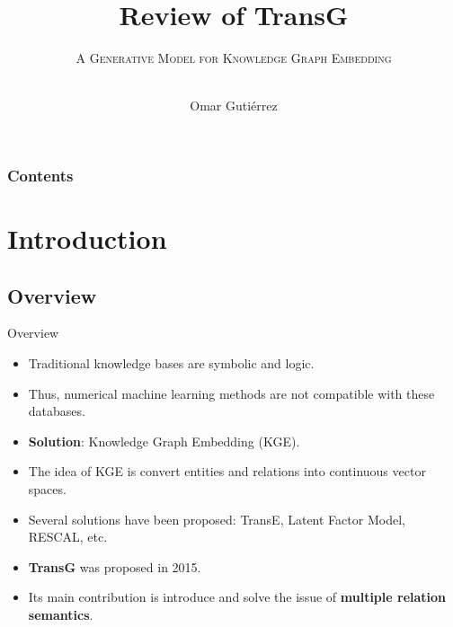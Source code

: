 \documentclass[xcolor={x11names,svgnames,dvipsnames},trans]{beamer}
\author[Omar Gutiérrez]{\texorpdfstring{Omar Gutiérrez}{Omar Gutiérrez}}
\title{Review of TransG}
\subtitle{\texorpdfstring{\textsc{A Generative Model for Knowledge Graph Embedding}\\%
\hrulefill\ \adforn{57}\thickspace\thickspace\adforn{29}\ \hrulefill}{}}
\date[\ccbyncsa]{\ccbyncsa}
\begin{document}
\begin{frame}[plain]
\maketitle
\end{frame}

\begin{frame} \frametitle{Contents}
    \tableofcontents
\end{frame}


\section{Introduction}


\subsection{Overview}
\begin{frame}{Overview}
    \begin{itemize}
        \item Traditional knowledge bases are symbolic and logic.
        \item Thus, numerical machine learning methods are not compatible with these databases.
        \item \textbf{Solution}: Knowledge Graph Embedding (KGE).
        \item The idea of KGE is convert entities and relations into continuous vector spaces.
        \item Several solutions have been proposed: TransE, Latent Factor Model, RESCAL, etc.
        \item \textbf{TransG} was proposed in 2015.
        \item Its main contribution is introduce and solve the issue of \textbf{multiple relation semantics}.
    \end{itemize}
\end{frame}
\end{document}
